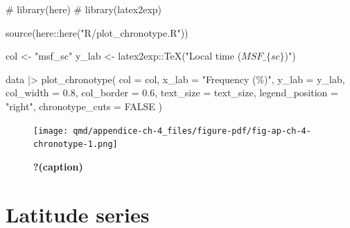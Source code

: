 \documentclass[
  12pt,
  a4paper,
  oneside]{tesesusp}
\newenvironment{Shaded}{\begin{snugshade}}{\end{snugshade}}
\newcommand{\AttributeTok}[1]{\textcolor[rgb]{0.40,0.45,0.13}{#1}}
\newcommand{\CommentTok}[1]{\textcolor[rgb]{0.37,0.37,0.37}{#1}}
\newcommand{\ConstantTok}[1]{\textcolor[rgb]{0.56,0.35,0.01}{#1}}
\newcommand{\FloatTok}[1]{\textcolor[rgb]{0.68,0.00,0.00}{#1}}
\newcommand{\FunctionTok}[1]{\textcolor[rgb]{0.28,0.35,0.67}{#1}}
\newcommand{\NormalTok}[1]{\textcolor[rgb]{0.00,0.23,0.31}{#1}}
\newcommand{\OtherTok}[1]{\textcolor[rgb]{0.00,0.23,0.31}{#1}}
\newcommand{\SpecialCharTok}[1]{\textcolor[rgb]{0.37,0.37,0.37}{#1}}
\newcommand{\StringTok}[1]{\textcolor[rgb]{0.13,0.47,0.30}{#1}}
\begin{document}
\begin{Shaded}
\begin{Highlighting}[numbers=left,,]
\CommentTok{\# library(here)}
\CommentTok{\# library(latex2exp)}

\FunctionTok{source}\NormalTok{(here}\SpecialCharTok{::}\FunctionTok{here}\NormalTok{(}\StringTok{"R/plot\_chronotype.R"}\NormalTok{))}

\NormalTok{col }\OtherTok{\textless{}{-}} \StringTok{"msf\_sc"}
\NormalTok{y\_lab }\OtherTok{\textless{}{-}}\NormalTok{ latex2exp}\SpecialCharTok{::}\FunctionTok{TeX}\NormalTok{(}\StringTok{"Local time ($MSF\_\{sc\}$)"}\NormalTok{)}

\NormalTok{data }\SpecialCharTok{|\textgreater{}}
  \FunctionTok{plot\_chronotype}\NormalTok{(}
    \AttributeTok{col =}\NormalTok{ col, }
    \AttributeTok{x\_lab =} \StringTok{"Frequency (\%)"}\NormalTok{,}
    \AttributeTok{y\_lab =}\NormalTok{ y\_lab,}
    \AttributeTok{col\_width =} \FloatTok{0.8}\NormalTok{, }
    \AttributeTok{col\_border =} \FloatTok{0.6}\NormalTok{, }
    \AttributeTok{text\_size =}\NormalTok{ text\_size,}
    \AttributeTok{legend\_position =} \StringTok{"right"}\NormalTok{,}
    \AttributeTok{chronotype\_cuts =} \ConstantTok{FALSE}
\NormalTok{  )}
\end{Highlighting}
\end{Shaded}

\begin{figure}[H]

\caption{\label{fig-ap-ch-4-chronotype}\textbf{?(caption)}}

{\centering \texttt{[image: qmd/appendice-ch-4\_files/figure-pdf/fig-ap-ch-4-chronotype-1.png]}

}

\end{figure}

\hypertarget{latitude-series}{%
\section{Latitude series}\label{latitude-series}}
\end{document}

